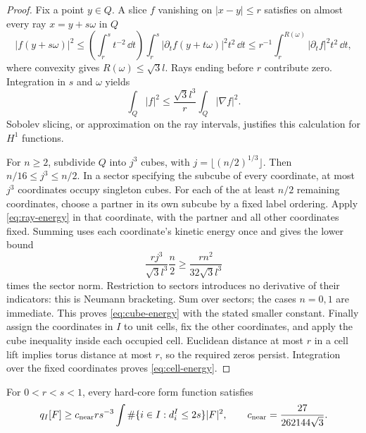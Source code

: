 \begin{proof}
Fix a point $y\in Q$. A slice $f$ vanishing on $|x-y|\le r$ satisfies
on almost every ray $x=y+s\omega$ in $Q$
\[
 |f(y+s\omega)|^2
 \le\left(\int_r^s t^{-2}\,\dd t\right)
      \int_r^s|\partial_t f(y+t\omega)|^2t^2\,\dd t
 \le r^{-1}\int_r^{R(\omega)}|\partial_t f|^2t^2\,\dd t,
\]
where convexity gives $R(\omega)\le\sqrt3l$. Rays ending before $r$
contribute zero. Integration in $s$ and $\omega$ yields
\begin{equation}\label{eq:ray-energy}
 \int_Q|f|^2\le\frac{\sqrt3l^3}{r}\int_Q|\nabla f|^2.
\end{equation}
Sobolev slicing, or approximation on the ray intervals, justifies this
calculation for $H^1$ functions.

For $n\ge2$, subdivide $Q$ into $j^3$ cubes, with
$j=\lfloor(n/2)^{1/3}\rfloor$. Then $n/16\le j^3\le n/2$.
In a sector specifying the subcube of every coordinate, at most $j^3$
coordinates occupy singleton cubes. For each of the at least $n/2$
remaining coordinates, choose a partner in its own subcube by a fixed
label ordering. Apply \eqref{eq:ray-energy} in that coordinate, with
the partner and all other coordinates fixed. Summing uses each coordinate's
kinetic energy once and gives the lower bound
\[
 \frac{rj^3}{\sqrt3l^3}\frac n2
 \ge\frac{rn^2}{32\sqrt3l^3}
\]
times the sector norm. Restriction to sectors introduces no derivative
of their indicators: this is Neumann bracketing. Sum over sectors; the
cases $n=0,1$ are immediate. This proves \eqref{eq:cube-energy} with
the stated smaller constant. Finally assign the coordinates in $I$ to
unit cells, fix the other coordinates, and apply the cube inequality
inside each occupied cell. Euclidean distance at most $r$ in a cell
lift implies torus distance at most $r$, so the required zeros persist.
Integration over the fixed coordinates proves \eqref{eq:cell-energy}.
\end{proof}

\begin{lemma}\label{lem:close}
For $0<r<s<1$, every hard-core form function satisfies
\begin{equation}\label{eq:close-energy}
 q_I[F]\ge c_{\rm near}rs^{-3}
       \int\#\{i\in I:d_i^I\le2s\}|F|^2,
 \qquad c_{\rm near}=\frac{27}{262144\sqrt3}.
\end{equation}
\end{lemma}

